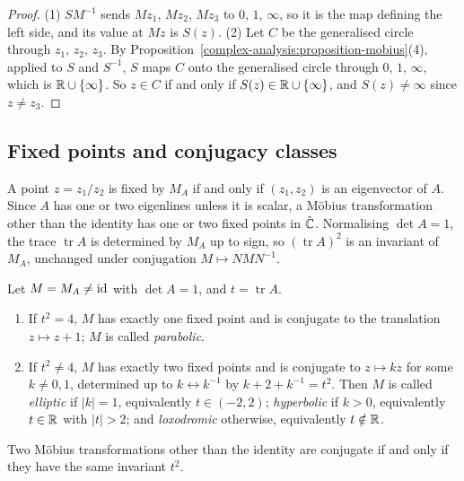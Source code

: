 \begin{proof}
(1) $SM^{-1}$ sends $Mz_1$, $Mz_2$, $Mz_3$ to $0$, $1$, $\infty$, so it is the map defining the left side, and its value at $Mz$ is $S(z)$. (2) Let $C$ be the generalised circle through $z_1$, $z_2$, $z_3$. By
Proposition~\ref{complex-analysis:proposition-mobius}(4), applied to $S$ and $S^{-1}$, $S$ maps $C$ onto the generalised circle through $0$, $1$, $\infty$, which is $\mathbb{R} \cup \{\infty\}$. So $z \in C$ if and only if
$S(z) \in \mathbb{R} \cup \{\infty\}$, and $S(z) \neq \infty$ since $z \neq z_3$.
\end{proof}

\subsection{Fixed points and conjugacy classes}\label{complex-analysis:subsection-mobius-classification}

A point $z = z_1/z_2$ is fixed by $M_A$ if and only if $(z_1, z_2)$ is an eigenvector of $A$. Since $A$ has one or two eigenlines unless it is scalar, a M\"obius transformation other than the identity has one or two
fixed points in $\hat{\mathbb{C}}$. Normalising $\det A = 1$, the trace $\operatorname{tr}A$ is determined by $M_A$ up to sign, so $(\operatorname{tr}A)^2$ is an invariant of $M_A$, unchanged under
conjugation $M \mapsto NMN^{-1}$.

\begin{theorem}\label{complex-analysis:theorem-mobius-classification}
Let $M = M_A \neq \mathrm{id}$ with $\det A = 1$, and $t = \operatorname{tr}A$.
\begin{enumerate}
\item If $t^2 = 4$, $M$ has exactly one fixed point and is conjugate to the translation $z \mapsto z + 1$; $M$ is called \emph{parabolic}.
\item If $t^2 \neq 4$, $M$ has exactly two fixed points and is conjugate to $z \mapsto kz$ for some $k \neq 0, 1$, determined up to $k \leftrightarrow k^{-1}$ by $k + 2 + k^{-1} = t^2$. Then $M$ is called \emph{elliptic} if
$|k| = 1$, equivalently $t \in (-2, 2)$; \emph{hyperbolic} if $k > 0$, equivalently $t \in \mathbb{R}$ with $|t| > 2$; and \emph{loxodromic} otherwise, equivalently $t \notin \mathbb{R}$.
\end{enumerate}
Two M\"obius transformations other than the identity are conjugate if and only if they have the same invariant $t^2$.
\end{theorem}

